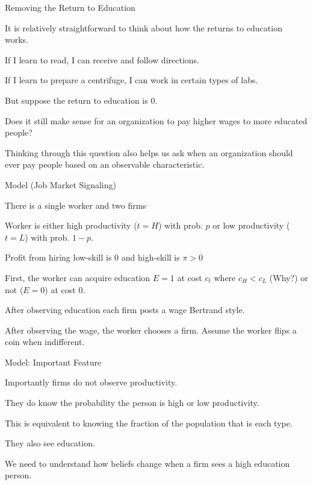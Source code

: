 \documentclass[aspectratio=169,usenames,dvipsnames]{beamer}
\newenvironment{wideitemize}{\itemize\addtolength{\itemsep}{10pt}}{\enditemize}
\begin{document}
\begin{frame}{Removing the Return to Education}

\begin{wideitemize}
    \item It is relatively straightforward to think about how the returns to education works.
    \item If I learn to read, I can receive and follow directions.
    \item If I learn to prepare a centrifuge, I can work in certain types of labs.
    \item But suppose the return to education is 0.
    \item Does it still make sense for an organization to pay higher wages to more educated people?
    \item Thinking through this question also helps us ask when an organization should ever pay people based on an observable characteristic.
\end{wideitemize}
    
\end{frame}

\begin{frame}{Model (Job Market Signaling)}

\begin{wideitemize}
    \item There is a single worker and two firms
    \item Worker is either high productivity ($t=H$) with prob. $p$ or low productivity ($t=L$) with prob. $1-p$.
    \item Profit from hiring low-skill is 0 and high-skill is $\pi>0$
    \item First, the worker can acquire education $E=1$ at cost $c_t$ where $c_H<c_L$ (Why?) or not ($E=0$) at cost 0.
    \item  After observing education each firm posts a wage Bertrand style.
    \item After observing the wage, the worker chooses a firm. Assume the worker flips a coin when indifferent.
\end{wideitemize}
\end{frame}


\begin{frame}{Model: Important Feature}
\begin{wideitemize}
    \item Importantly firms do not observe productivity.
    \item They do know the probability the person is high or low productivity.
    \item This is equivalent to knowing the fraction of the population that is each type.
    \item They also see education.
    \item We need to understand how beliefs change when a firm sees a high education person.
\end{wideitemize}
    
\end{frame}
\end{document}
